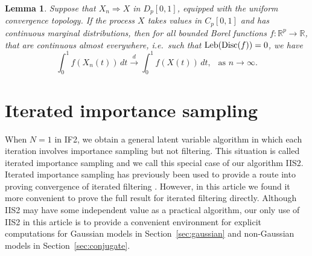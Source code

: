\documentclass[11pt]{article}
\def\R{\mathbb{R}}
\newtheorem{lemma}{Lemma}
\newcommand\Disc{\mathrm{Disc}}
\begin{document}
\begin{lemma} Suppose that $X_n\Rightarrow X$ in $D_p[0,1]$, equipped with the uniform convergence topology.
If the process $X$ takes values in $C_p[0,1]$ and has continuous marginal distributions, then for all bounded Borel functions $f:\R^p \to \R$,
that are continuous almost everywhere, i.e.\ such that ${\rm Leb}(\Disc(f)) = 0$, we have
$$
\int_0^1 f(X_n(t)) \, dt \stackrel{d}{\longrightarrow} \int_0^1 f(X(t)) \, dt,\ \ \mbox{ as }n\to\infty.
$$
\end{lemma}


\section{Iterated importance sampling}

When $N=1$ in IF2, we obtain a general latent variable algorithm in which each iteration involves importance sampling but not filtering. 
This situation is called iterated importance sampling \cite{ionides11} and we call this special case of our algorithm IIS2.
Iterated importance sampling has previously been used to provide a route into proving convergence of iterated filtering \cite{ionides11,doucet13}.
However, in this article we found it more convenient to prove the full result for iterated filtering directly. 
Although IIS2 may have some independent value as a practical algorithm, our only use of IIS2 in this article is to provide a convenient environment for explicit computations for Gaussian models in Section~\ref{sec:gaussian} and non-Gaussian models in Section~\ref{sec:conjugate}.

\vspace{10mm}
\end{document}
